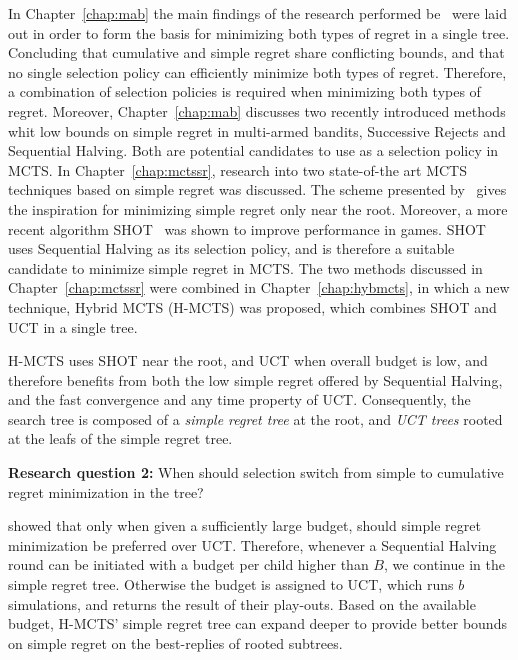 \documentclass{kecsmstr}
\begin{document}
In Chapter~\ref{chap:mab} the main findings of the research performed be~ were laid out in order to form the basis for minimizing both types of regret in a single tree. Concluding that cumulative and simple regret share conflicting bounds, and that no single selection policy can efficiently minimize both types of regret. Therefore, a combination of selection policies is required when minimizing both types of regret. Moreover, Chapter~\ref{chap:mab} discusses two recently introduced methods whit low bounds on simple regret in multi-armed bandits, Successive Rejects and Sequential Halving. Both are potential candidates to use as a selection policy in MCTS. In Chapter~\ref{chap:mctssr}, research into two state-of-the art MCTS techniques based on simple regret was discussed. The scheme presented by~ gives the inspiration for minimizing simple regret only near the root. Moreover, a more recent algorithm SHOT~ was shown to improve performance in games. SHOT uses Sequential Halving as its selection policy, and is therefore a suitable candidate to minimize simple regret in MCTS. The two methods discussed in Chapter~\ref{chap:mctssr} were combined in Chapter~\ref{chap:hybmcts}, in which a new technique, Hybrid MCTS (H-MCTS) was proposed, which combines SHOT and UCT in a single tree.

H-MCTS uses SHOT near the root, and UCT when overall budget is low, and therefore benefits from both the low simple regret offered by Sequential Halving, and the fast convergence and any time property of UCT. Consequently, the search tree is composed of a \emph{simple regret tree} at the root, and \emph{UCT trees} rooted at the leafs of the simple regret tree.

\vspace{2mm}
\textbf{Research question 2:} When should selection switch from simple to cumulative regret minimization in the tree?
\vspace{2mm}

 showed that only when given a sufficiently large budget, should simple regret minimization be preferred over UCT. Therefore, whenever a Sequential Halving round can be initiated with a budget per child higher than $B$, we continue in the simple regret tree. Otherwise the budget is assigned to UCT, which runs $b$ simulations, and returns the result of their play-outs. Based on the available budget, H-MCTS' simple regret tree can expand deeper to provide better bounds on simple regret on the best-replies of rooted subtrees. 
\end{document}
